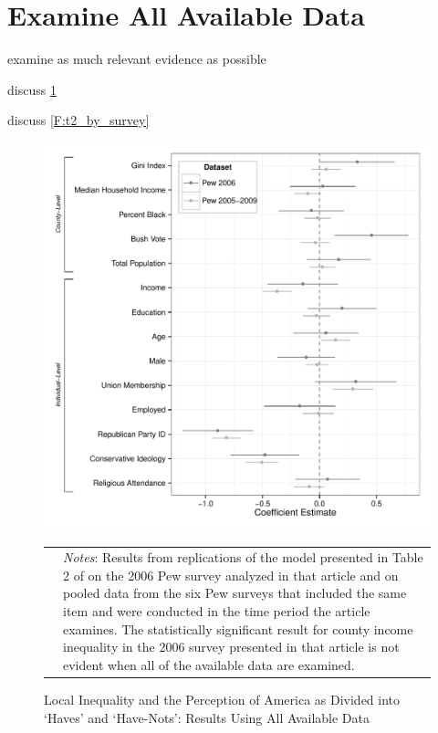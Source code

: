 
\section{Examine All Available Data}

examine as much relevant evidence as possible

discuss \ref{F:t2_pooled}

discuss \ref{F:t2_by_survey}


\begin{figure}[htbp] 
  \caption{Local Inequality and the Perception of America as Divided into `Haves' and `Have-Nots': Results Using All Available Data}
  \label{F:t2_pooled}
  \begin{center}
    \includegraphics[width=5.25in]{../figures/03_examine_all_available_data_t2.pdf}
  \end{center}
  \begin{footnotesize}
  \begin{tabular}{p{.1in} p{5.1in}}
  & \emph{Notes}: Results from replications of the model presented in Table 2 of \citet{Newman2015} on the 2006 Pew survey analyzed in that article and on pooled data from the six Pew surveys that included the same item and were conducted in the time period the article examines.  The statistically significant result for county income inequality in the 2006 survey presented in that article is not evident when all of the available data are examined.
  \end{tabular}
  \end{footnotesize}
\end{figure}

